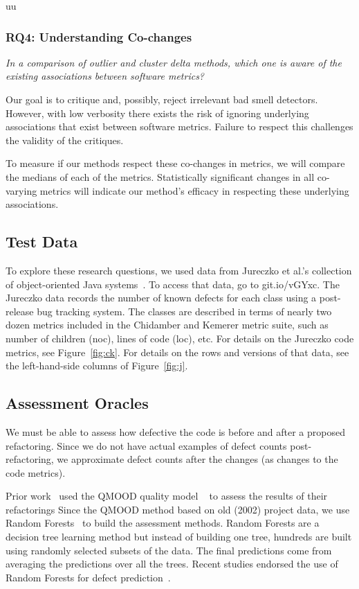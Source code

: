 uu \documentclass[final,twocolumn,5p]{elsarticle}
\newcommand{\fig}[1]{Figure~\ref{fig:#1}}
\theoremstyle{break}
\begin{document}
\begin{itemize}
\subsubsection{RQ4: Understanding Co-changes} 

{\em In a comparison of outlier and cluster delta
methods, which one is aware of the existing associations between software metrics?}

Our goal is to critique and, possibly, reject irrelevant bad smell detectors. However, with low verbosity there exists the risk of ignoring underlying associations that exist between software metrics. Failure to respect this challenges the validity of the critiques. 


To measure if our methods respect these co-changes in metrics, we will compare the medians of each of the metrics. Statistically significant changes in all co-varying metrics will indicate our method's efficacy in respecting these underlying associations.
 
 
\subsection{Test Data}\label{sect:tesd}

To explore these research questions,
we used data from
Jureczko et al.'s collection of object-oriented Java systems~\cite{jureczko10}. To access that data, go to   git.io/vGYxc.
The Jureczko data records the number of known defects for each class using a post-release bug tracking system. The classes are described in terms of nearly two dozen metrics included in the Chidamber and Kemerer metric suite, such as number of children (noc), lines of code (loc), etc. For details on the Jureczko code
metrics, see  \fig{ck}. For details on the rows and versions
of that data, see the left-hand-side columns of \fig{j}.



 
\subsection{Assessment Oracles}
\label{sect:eval}
We must be able to assess how defective the code is before and after a proposed refactoring. Since we do not have actual  examples of defect counts post-refactoring, we   approximate   defect counts after the   changes   (as changes to the code metrics).

Prior work~\cite{Cheng10,OKeeffe08,OKeeffe07,Moghadam2011,Mkaouer14} 
used the QMOOD   quality model ~\cite{Bansiya02} to assess the results of their refactorings
Since the QMOOD method based on old (2002) project data, we use Random Forests~\cite{Breiman2001} to build
the assessment methods.
  Random Forests are a decision tree learning method but
  instead of building one tree, hundreds are built using
  randomly selected subsets of the data. The final predictions
  come from averaging the predictions over all the trees.
  Recent studies endorsed the use
  of  Random Forests for  defect prediction~\cite{lessmann}.
  

\end{itemize}
\end{document}
